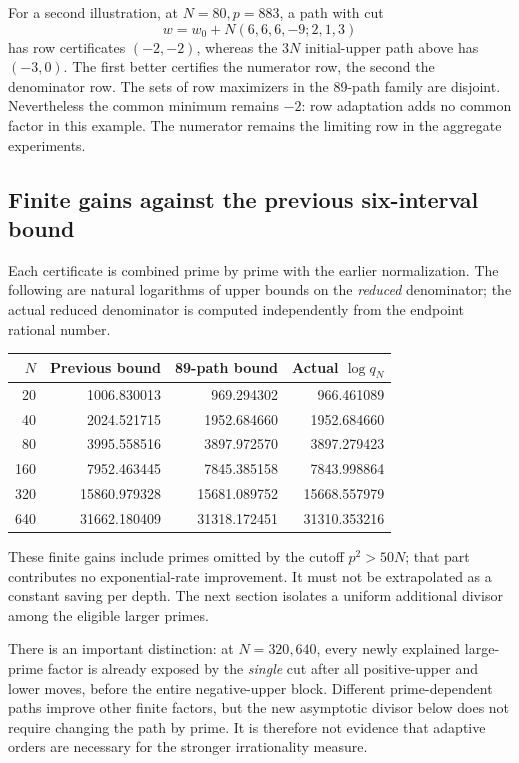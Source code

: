 \documentclass[11pt]{article}
\begin{document}
For a second illustration, at $N=80,p=883$, a path with cut
\[
w=w_0+N(6,6,6,-9;2,1,3)
\]
has row certificates $(-2,-2)$, whereas the $3N$ initial-upper
path above has $(-3,0)$. The first better certifies the numerator
row, the second the denominator row. The sets of row maximizers in
the 89-path family are disjoint. Nevertheless the common minimum
remains $-2$: row adaptation adds no common factor in this example.
The numerator remains the limiting row in the aggregate experiments.

\subsection{Finite gains against the previous six-interval bound}
Each certificate is combined prime by prime with the earlier
normalization. The following are natural logarithms of upper bounds
on the \emph{reduced} denominator; the actual reduced denominator is
computed independently from the endpoint rational number.
\begin{center}
\begin{tabular}{rrrr}
\toprule
$N$&Previous bound&89-path bound&Actual $\log q_N$\\\midrule
20&1006.830013&969.294302&966.461089\\
40&2024.521715&1952.684660&1952.684660\\
80&3995.558516&3897.972570&3897.279423\\
160&7952.463445&7845.385158&7843.998864\\
320&15860.979328&15681.089752&15668.557979\\
640&31662.180409&31318.172451&31310.353216\\
\bottomrule
\end{tabular}
\end{center}
These finite gains include primes omitted by the cutoff $p^2>50N$;
that part contributes no exponential-rate improvement. It must not be
extrapolated as a constant saving per depth. The next section isolates
a uniform additional divisor among the eligible larger primes.

There is an important distinction: at $N=320,640$, every newly explained
large-prime factor is already exposed by the \emph{single} cut after all
positive-upper and lower moves, before the entire negative-upper block.
Different prime-dependent paths improve other finite factors, but the
new asymptotic divisor below does not require changing the path by prime.
It is therefore not evidence that adaptive orders are necessary for the
stronger irrationality measure.
\end{document}
